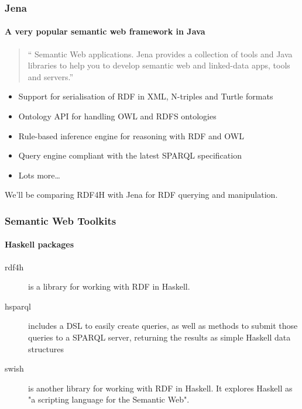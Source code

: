 \documentclass{beamer}
\begin{document}
\begin{frame}
\frametitle{Jena}
\framesubtitle{A very popular semantic web framework in Java}

\begin{quotation}
`` Semantic Web applications. Jena provides a collection of tools and Java libraries to help you to develop semantic web and linked-data apps, tools and servers.''
\end{quotation}

\begin{itemize}
\item Support for serialisation of RDF in XML, N-triples and Turtle formats
\item Ontology API for handling OWL and RDFS ontologies
\item Rule-based inference engine for reasoning with RDF and OWL
\item Query engine compliant with the latest SPARQL specification
\item Lots more\ldots
\end{itemize}

\bigskip
We'll be comparing RDF4H with Jena for RDF querying and manipulation.

\end{frame}


\begin{frame}
\frametitle{Semantic Web Toolkits}
\framesubtitle{Haskell packages}

\begin{description}
\item[rdf4h] is a library for working with RDF in Haskell.
\bigskip
\item[hsparql] includes a DSL to easily create queries, as well as
  methods to submit those queries to a SPARQL server, returning the
  results as simple Haskell data structures
\bigskip
\item[swish] is another library for working with RDF in Haskell. It
  explores Haskell as "a scripting language for the Semantic
  Web".
\end{description}

\end{frame}
\end{document}
